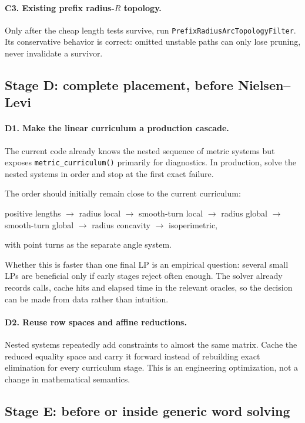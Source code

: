 \documentclass[11pt]{article}
\theoremstyle{definition}
\theoremstyle{remark}
\begin{document}
\paragraph{C3. Existing prefix radius-$R$ topology.}
Only after the cheap length tests survive, run \texttt{PrefixRadiusArcTopologyFilter}.  Its conservative behavior is correct: omitted unstable paths can only lose pruning, never invalidate a survivor.

\subsection{Stage D: complete placement, before Nielsen--Levi}

\paragraph{D1. Make the linear curriculum a production cascade.}
The current code already knows the nested sequence of metric systems but exposes \texttt{metric\_curriculum()} primarily for diagnostics.  In production, solve the nested systems in order and stop at the first exact failure.

The order should initially remain close to the current curriculum:
\begin{center}
positive lengths $\to$ radius local $\to$ smooth-turn local $\to$ radius global
$\to$ smooth-turn global $\to$ radius concavity $\to$ isoperimetric,
\end{center}
with point turns as the separate angle system.

Whether this is faster than one final LP is an empirical question: several small LPs are beneficial only if early stages reject often enough.  The solver already records calls, cache hits and elapsed time in the relevant oracles, so the decision can be made from data rather than intuition.

\paragraph{D2. Reuse row spaces and affine reductions.}
Nested systems repeatedly add constraints to almost the same matrix.  Cache the reduced equality space and carry it forward instead of rebuilding exact elimination for every curriculum stage.  This is an engineering optimization, not a change in mathematical semantics.

\subsection{Stage E: before or inside generic word solving}
\end{document}
